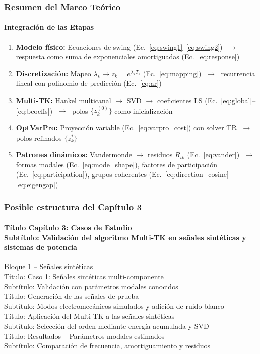 \documentclass{beamer}
\begin{document}
\begin{frame}
\frametitle{Resumen del Marco Teórico}
\framesubtitle{Integración de las Etapas}

\begin{enumerate}
    \item \textbf{Modelo físico:} Ecuaciones de swing (Ec.~\ref{eq:swing1}--\ref{eq:swing2})
          $\;\to\;$ respuesta como suma de exponenciales amortiguadas (Ec.~\ref{eq:response})
    \vspace{0.3em}
    \item \textbf{Discretización:} Mapeo $\lambda_k \to z_k = e^{\lambda_k T_s}$ (Ec.~\ref{eq:mapping})
          $\;\to\;$ recurrencia lineal con polinomio de predicción (Ec.~\ref{eq:ar})
    \vspace{0.3em}
    \item \textbf{Multi-TK:} Hankel multicanal $\to$ SVD $\to$ coeficientes LS (Ec.~\ref{eq:global}--\ref{eq:bcoeffs})
          $\;\to\;$ polos $\{z_k^{(0)}\}$ como inicialización
    \vspace{0.3em}
    \item \textbf{OptVarPro:} Proyección variable (Ec.~\ref{eq:varpro_cost}) con solver TR
          $\;\to\;$ polos refinados $\{z_k^*\}$
    \vspace{0.3em}
    \item \textbf{Patrones dinámicos:} Vandermonde $\to$ residuos $R_{ik}$ (Ec.~\ref{eq:vander})
          $\;\to\;$ formas modales (Ec.~\ref{eq:mode_shape}), factores de participación (Ec.~\ref{eq:participation}),
          grupos coherentes (Ec.~\ref{eq:direction_cosine}--\ref{eq:eigengap})
\end{enumerate}

\end{frame}

\begin{frame} 
    \frametitle{Posible estructura del Capítulo 3}
\framesubtitle{Título Capítulo 3: Casos de Estudio\\
Subtítulo: Validación del algoritmo Multi‑TK en señales sintéticas y sistemas de potencia\\}



Bloque 1 – Señales sintéticas\\
Título: Caso 1: Señales sintéticas multi-componente\\
Subtítulo: Validación con parámetros modales conocidos\\

Título: Generación de las señales de prueba\\
Subtítulo: Modos electromecánicos simulados y adición de ruido blanco\\

Título: Aplicación del Multi‑TK a las señales sintéticas\\
Subtítulo: Selección del orden mediante energía acumulada y SVD\\

Título: Resultados – Parámetros modales estimados\\
Subtítulo: Comparación de frecuencia, amortiguamiento y residuos\\

\end{frame}
\end{document}
